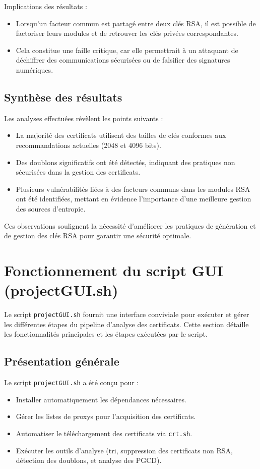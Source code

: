 \documentclass[11pt,a4paper]{article}
\begin{document}
Implications des résultats :
\begin{itemize}
    \item Lorsqu'un facteur commun est partagé entre deux clés RSA, il est possible de factoriser leurs modules et de retrouver les clés privées correspondantes.
    \item Cela constitue une faille critique, car elle permettrait à un attaquant de déchiffrer des communications sécurisées ou de falsifier des signatures numériques.
\end{itemize}

\subsection{Synthèse des résultats}
Les analyses effectuées révèlent les points suivants :
\begin{itemize}
    \item La majorité des certificats utilisent des tailles de clés conformes aux recommandations actuelles (2048 et 4096 bits).
    \item Des doublons significatifs ont été détectés, indiquant des pratiques non sécurisées dans la gestion des certificats.
    \item Plusieurs vulnérabilités liées à des facteurs communs dans les modules RSA ont été identifiées, mettant en évidence l'importance d'une meilleure gestion des sources d'entropie.
\end{itemize}

Ces observations soulignent la nécessité d'améliorer les pratiques de génération et de gestion des clés RSA pour garantir une sécurité optimale.


\section{Fonctionnement du script GUI (projectGUI.sh)}

Le script \texttt{projectGUI.sh} fournit une interface conviviale pour exécuter et gérer les différentes étapes du pipeline d'analyse des certificats. Cette section détaille les fonctionnalités principales et les étapes exécutées par le script.

\subsection{Présentation générale}
Le script \texttt{projectGUI.sh} a été conçu pour :
\begin{itemize}
    \item Installer automatiquement les dépendances nécessaires.
    \item Gérer les listes de proxys pour l'acquisition des certificats.
    \item Automatiser le téléchargement des certificats via \texttt{crt.sh}.
    \item Exécuter les outils d'analyse (tri, suppression des certificats non RSA, détection des doublons, et analyse des PGCD).
\end{itemize}
\end{document}
